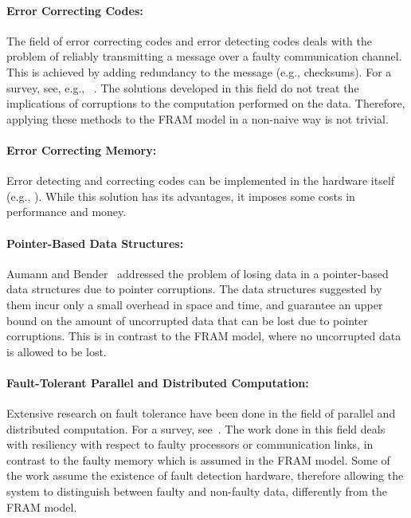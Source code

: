 \documentclass{llncs}
\begin{document}
\paragraph{Error Correcting Codes:}
		
		The field of error correcting codes and error detecting codes
		deals with the problem of reliably
		transmitting a message over a faulty communication channel.
		This is achieved by adding redundancy to the message (e.g., checksums).
		For a survey, see, e.g., ~\cite{ecc_survey}.
		The solutions developed in this field do not treat the implications of corruptions
		to the computation performed on the data.
		Therefore, applying these methods to the FRAM model
		in a non-naive way is not trivial.   
		
\paragraph{Error Correcting Memory:}
		
		Error detecting and correcting codes can be 
		implemented in the hardware itself (e.g., \cite{error_correcting_memory}).
		While this solution has its advantages,
		it imposes some costs in performance and money.
		
\paragraph{Pointer-Based Data Structures:}

		Aumann and Bender~\cite{aumann_bender} addressed the problem of losing
		data in a pointer-based data structures due to pointer corruptions.
		The data structures suggested by them incur only a small overhead in space and time,
		and guarantee an upper bound on the amount of uncorrupted data that can be lost due
		to pointer corruptions.
		This is in contrast to the FRAM model, where no uncorrupted  data is allowed to be lost.
		
\paragraph{Fault-Tolerant Parallel and Distributed Computation:}
	
		Extensive research on fault tolerance have been done in the field of 
		parallel and distributed computation.
		For a survey, see~\cite{fault_tolerant_distributed_computation}.
		The work done in this field deals with resiliency with respect to
		faulty processors or communication links, in contrast to the faulty memory
		which is assumed in the FRAM model.
		Some of the work assume the existence of fault detection
		hardware, therefore allowing the system to distinguish between faulty and non-faulty data,
		differently from the FRAM model.
\end{document}
